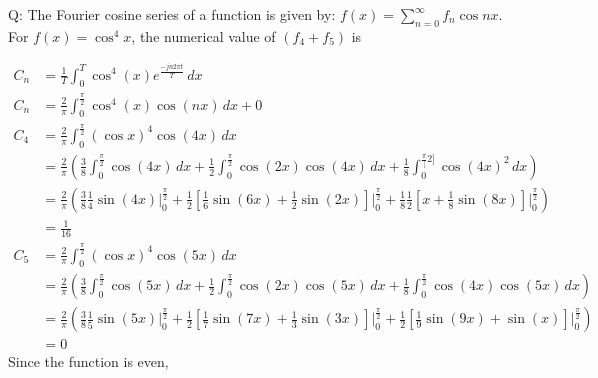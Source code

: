 \documentclass[journal,12pt,onecolumn]{IEEEtran}
\theoremstyle{remark}
\begin{document}
\let\vec\mathbf







\bigskip


Q: The Fourier cosine series of a function is given by: $f(x) = \sum_{n=0}^{\infty} f_{n}\cos{nx}$. For $f(x) = \cos^{4}x$, the numerical value of $(f_{4} + f_{5})$ is
 
\solution
\begin{table}[h]

\end{table}
\begin{align}
C_n &= \frac{1}{T} \int_{0}^{T} \cos^4(x) e^{\frac{-jn2\pi t}{T}} \,dx \\
    C_n &= \frac{2}{\pi} \int_{0}^{\frac{\pi}{2}} \cos^4(x) \cos(nx) \,dx + 0 \\
   C_4 &= \frac{2}{\pi} \int_{0}^{\frac{\pi}{2}} (\cos x)^4 \cos(4x) \, dx \\
&= \frac{2}{\pi} \left( \frac{3}{8} \int_{0}^{\frac{\pi}{2}} \cos(4x) \, dx + \frac{1}{2} \int_{0}^{\frac{\pi}{2}} \cos(2x) \cos(4x) \, dx + \frac{1}{8} \int_{0}^{\frac{\pi}[2]} \cos(4x)^2 \, dx \right) \\
&= \frac{2}{\pi} \left( \frac{3}{8} \frac{1}{4} \sin(4x) \Bigg|_{0}^{\frac{\pi}{2}} + \frac{1}{2} \left[\frac{1}{6} \sin(6x) + \frac{1}{2}\sin(2x) \right] \Bigg|_{0}^{\frac{\pi}{2}} + \frac{1}{8} \frac{1}{2} \left[ x + \frac{1}{8} \sin(8x) \right] \Bigg|_{0}^{\frac{\pi}{2}}  \right) \\
&=\frac{1}{16} \\
    C_5 &= \frac{2}{\pi} \int_{0}^{\frac{\pi}{2}} (\cos x)^4 \cos(5x) \, dx \\
&= \frac{2}{\pi} \left( \frac{3}{8} \int_{0}^{\frac{\pi}{2}} \cos(5x) \, dx + \frac{1}{2} \int_{0}^{\frac{\pi}{2}} \cos(2x) \cos(5x) \, dx + \frac{1}{8} \int_{0}^{\frac{\pi}{2}} \cos(4x) \cos(5x) \, dx \right) \\
&= \frac{2}{\pi} \left(\frac{3}{8} \frac{1}{5} \sin(5x) \Bigg|_{0}^{\frac{\pi}{2}} + \frac{1}{2} \left[ \frac{1}{7} \sin(7x) + \frac{1}{3} \sin(3x) \right] \Bigg|_{0}^{\frac{\pi}{2}} + \frac{1}{2} \left[ \frac{1}{9} \sin(9x) + \sin(x) \right] \Bigg|_{0}^{\frac{\pi}{2}} \right) \\
&= 0 
\end{align}
Since the function is even, 
\end{document}
